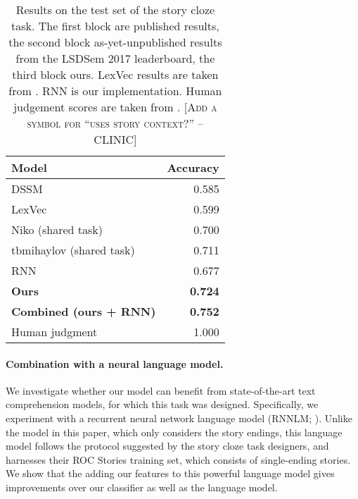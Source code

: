 \documentclass[11pt,a4paper]{article}
\newcommand{\resolved}[1]{}
\newcommand{\nascomment}[1]{{\color{blue}\textsc{[#1 --nas]}}}
\newcommand{\clinic}[1]{{\color{magenta}\textsc{[#1 --CLINIC]}}}
\begin{document}
\begin{table}[!t]
\begin{center}
\begin{tabular}{|l|r|} \hline
{\bf Model} & {\bf Accuracy} \\ \hline
{DSSM} \cite{Mostafazadeh:2016} & 0.585 \\ 
{LexVec} \cite{Salle:2016} & 0.599 \\ \hline\hline
{Niko (shared task)}	& 0.700\\ 
{tbmihaylov (shared task)} & 0.711\\ \hline\hline
{RNN}		& 0.677 \\ 
{\bf Ours} & {\bf 0.724} \\ 
{\bf Combined (ours + RNN)} & {\bf 0.752} \\ \hline\hline
Human judgment & 1.000 \\ \hline
\end{tabular}
\end{center}
\caption{\label{cloze_results}
Results on the test set of the  story cloze task. 
The first block are published results, the second block
as-yet-unpublished results from the LSDSem 2017 leaderboard, the third
block ours.
LexVec results are taken from \cite{Speer:2016}.
RNN is our implementation. 
Human judgement scores are taken from \cite{Mostafazadeh:2016}. \resolved{\nascomment{I added 0s to ``Niko'' result
  and ``human''
  so sig. digits would line up.  if we don't have sig digits for some
  of them, make the zeros white so the numbers line up.  where did the
human judgments come from?  those are not mentioned in our text anywhere!}
}\clinic{Add a symbol for ``uses story context?''}}
\end{table}


\paragraph{Combination with a neural language model.}
We investigate whether our model can benefit from state-of-the-art text comprehension models, for which this task was designed. 
Specifically, we experiment with a recurrent neural network language model (RNNLM; \citealp{mikolov2010recurrent}). %
Unlike the model in this paper, which only considers the story endings, this language model follows the protocol suggested by the story cloze task designers, and harnesses their ROC Stories training set, which consists of single-ending stories. 
We show that the adding our features to this powerful language model
gives improvements over our classifier as well as the language
model.  \resolved{\nascomment{reworded.  more important that our features help
  the language model, than the other way around!}}
\end{document}
